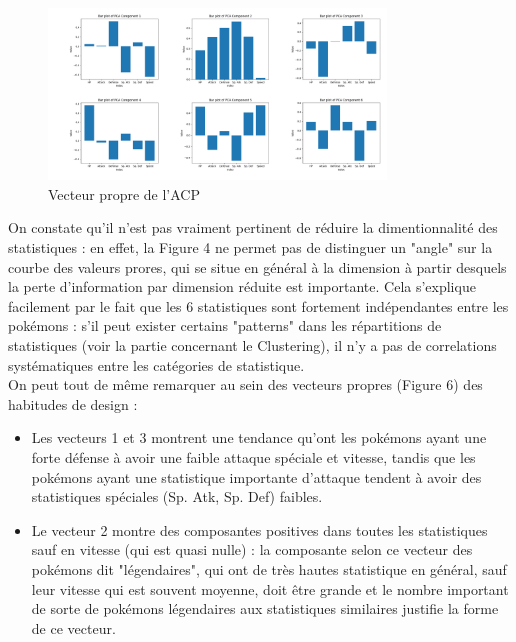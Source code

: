 \documentclass[a4paper,12pt]{article}
\begin{document}
\begin{figure}[htbp]
    \includegraphics[width=0.8\textwidth]{Image/eigen_vector_PCA.png}
    \caption{Vecteur propre de l'ACP}
\end{figure}

On constate qu'il n'est pas vraiment pertinent de réduire la dimentionnalité des
statistiques : en effet, la Figure 4 ne permet pas de distinguer un "angle" sur
la courbe des valeurs prores, qui se situe en général à la dimension à partir
desquels la perte d'information par dimension réduite est importante. Cela
s'explique facilement par le fait que les 6 statistiques sont fortement
indépendantes entre les pokémons : s'il peut exister certains "patterns" dans
les répartitions de statistiques (voir la partie concernant le Clustering), il
n'y a pas de correlations systématiques entre les catégories de statistique. \\
On peut tout de même remarquer au sein des vecteurs propres (Figure 6) des
habitudes de design :
\begin{itemize}
    \item Les vecteurs 1 et 3 montrent une tendance qu'ont les pokémons ayant
    une forte défense à avoir une faible attaque spéciale et vitesse, tandis que
    les pokémons ayant une statistique importante d'attaque tendent à avoir des
    statistiques spéciales (Sp. Atk, Sp. Def) faibles.
    \item Le vecteur 2 montre des composantes positives dans toutes les
    statistiques sauf en vitesse (qui est quasi nulle) : la composante selon ce
    vecteur des pokémons dit "légendaires", qui ont de très hautes statistique
    en général, sauf leur vitesse qui est souvent moyenne, doit être grande et
    le nombre important de sorte de pokémons légendaires aux statistiques similaires justifie la forme de ce vecteur.
\end{itemize}
\end{document}
